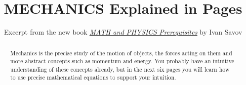 \documentclass[letterpaper,9pt,journal]{IEEEtran}
\title{ \Huge MECHANICS Explained in \Fourrr Pages}
\author{Excerpt from the new book \href{http://minireference.com/contents}{\emph{MATH and PHYSICS Prerequisites}} by Ivan Savov}
\date{}
\def\fourrr{six }
\newcommand{\dokutitlelevelone}[1]{\chapter{#1}}
\newcommand{\dokuitalic}[1]{\textsl{#1}}
\begin{document}
\maketitle


%

  

\begin{abstract}
Mechanics is the precise study of the motion of objects, the forces acting
on them and more abstract concepts such as momentum and energy.
You probably have an intuitive understanding of these concepts already,
but in the next \fourrr pages you will learn how to use precise mathematical
equations to support your intuition. 
\end{abstract}




%
\end{document}

